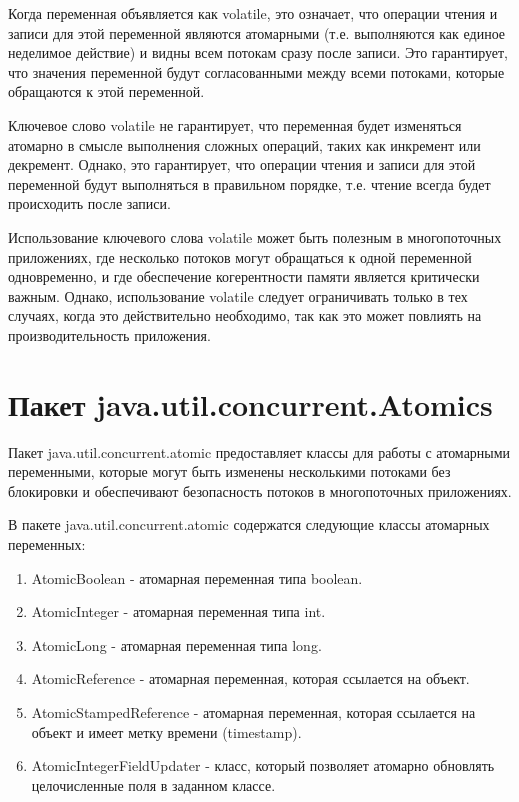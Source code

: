 Когда переменная объявляется как volatile, это означает, что операции чтения и записи для этой переменной являются атомарными (т.е. выполняются как единое неделимое действие) и видны всем потокам сразу после записи. Это гарантирует, что значения переменной будут согласованными между всеми потоками, которые обращаются к этой переменной.

Ключевое слово volatile не гарантирует, что переменная будет изменяться атомарно в смысле выполнения сложных операций, таких как инкремент или декремент. Однако, это гарантирует, что операции чтения и записи для этой переменной будут выполняться в правильном порядке, т.е. чтение всегда будет происходить после записи.

Использование ключевого слова volatile может быть полезным в многопоточных приложениях, где несколько потоков могут обращаться к одной переменной одновременно, и где обеспечение когерентности памяти является критически важным. Однако, использование volatile следует ограничивать только в тех случаях, когда это действительно необходимо, так как это может повлиять на производительность приложения.

\section{Пакет java.util.concurrent.Atomics}

Пакет java.util.concurrent.atomic предоставляет классы для работы с атомарными переменными, которые могут быть изменены несколькими потоками без блокировки и обеспечивают безопасность потоков в многопоточных приложениях.

В пакете java.util.concurrent.atomic содержатся следующие классы атомарных переменных:

\begin{enumerate}
    \item AtomicBoolean - атомарная переменная типа boolean.
    \item AtomicInteger - атомарная переменная типа int.
    \item AtomicLong - атомарная переменная типа long.
    \item AtomicReference - атомарная переменная, которая ссылается на объект.
    \item AtomicStampedReference - атомарная переменная, которая ссылается на объект и имеет метку времени (timestamp).
    \item AtomicIntegerFieldUpdater - класс, который позволяет атомарно обновлять целочисленные поля в заданном классе.
\end{enumerate}

